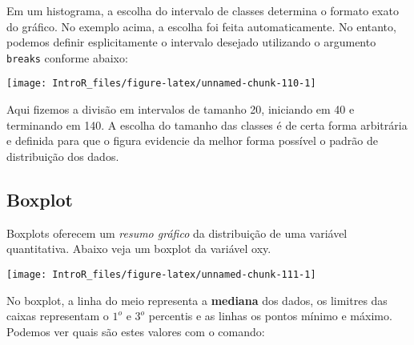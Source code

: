 \documentclass[
]{book}
\newenvironment{Shaded}{\begin{snugshade}}{\end{snugshade}}
\newcommand{\AttributeTok}[1]{\textcolor[rgb]{0.77,0.63,0.00}{#1}}
\newcommand{\DecValTok}[1]{\textcolor[rgb]{0.00,0.00,0.81}{#1}}
\newcommand{\FunctionTok}[1]{\textcolor[rgb]{0.00,0.00,0.00}{#1}}
\newcommand{\NormalTok}[1]{#1}
\newcommand{\OtherTok}[1]{\textcolor[rgb]{0.56,0.35,0.01}{#1}}
\newcommand{\SpecialCharTok}[1]{\textcolor[rgb]{0.00,0.00,0.00}{#1}}
\begin{document}
Em um histograma, a escolha do intervalo de classes determina o formato exato do gráfico. No exemplo acima, a escolha foi feita automaticamente. No entanto, podemos definir esplicitamente o intervalo desejado utilizando o argumento \texttt{breaks} conforme abaixo:

\begin{Shaded}
\end{Shaded}

\begin{center}\texttt{[image: IntroR\_files/figure-latex/unnamed-chunk-110-1]} \end{center}

Aqui fizemos a divisão em intervalos de tamanho 20, iniciando em 40 e terminando em 140. A escolha do tamanho das classes é de certa forma arbitrária e definida para que o figura evidencie da melhor forma possível o padrão de distribuição dos dados.

\hypertarget{boxplot}{%
\subsection{Boxplot}\label{boxplot}}

Boxplots oferecem um \emph{resumo gráfico} da distribuição de uma variável quantitativa. Abaixo veja um boxplot da variável oxy.

\begin{Shaded}
\end{Shaded}

\begin{center}\texttt{[image: IntroR\_files/figure-latex/unnamed-chunk-111-1]} \end{center}

No boxplot, a linha do meio representa a \textbf{mediana} dos dados, os limitres das caixas representam o \(1^o\) e \(3^o\) percentis e as linhas os pontos mínimo e máximo. Podemos ver quais são estes valores com o comando:
\end{document}
